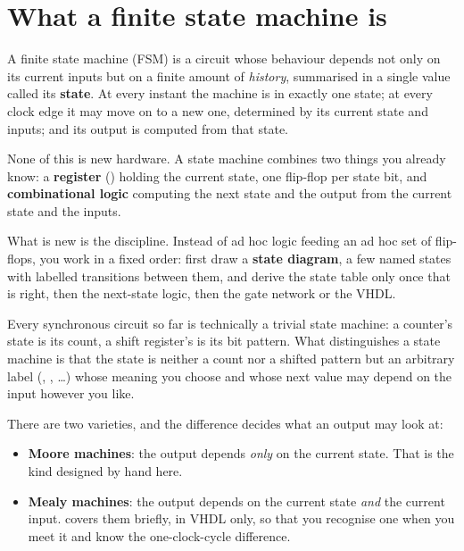 
\section{What a finite state machine is}
\label{c8:sec:what}

A finite state machine (FSM) is a circuit whose behaviour depends not only on its current inputs but
on a finite amount of \emph{history}, summarised in a single value called its \textbf{state}. At
every instant the machine is in exactly one state; at every clock edge it may move on to a new one,
determined by its current state and inputs; and its output is computed from that state.

None of this is new hardware. A state machine combines two things you already know: a
\textbf{register} () holding the current state, one flip-flop per state bit, and
\textbf{combinational logic} computing the next state and the output from the current state and the
inputs.

What is new is the discipline. Instead of ad hoc logic feeding an ad hoc set of flip-flops, you work
in a fixed order: first draw a \textbf{state diagram}, a few named states with labelled transitions
between them, and derive the state table only once that is right, then the next-state logic, then
the gate network or the VHDL.

Every synchronous circuit so far is technically a trivial state machine: a counter's state is its
count, a shift register's is its bit pattern. What distinguishes a state machine is that the state
is neither a count nor a shifted pattern but an arbitrary label (,
, \dots) whose meaning you choose and whose next value may depend on the input
however you like.

There are two varieties, and the difference decides what an output may look at:
\begin{itemize}
  \item \textbf{Moore machines}: the output depends \emph{only} on the current state. That is the
    kind designed by hand here.
  \item \textbf{Mealy machines}: the output depends on the current state \emph{and} the current
    input.  covers them briefly, in VHDL only, so that you recognise one when
    you meet it and know the one-clock-cycle difference.
\end{itemize}

